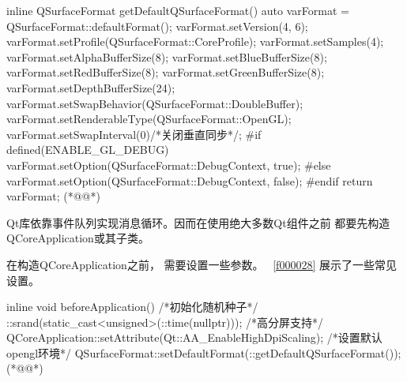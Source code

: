 \label{f000027}    %
\FloatBarrier                                  %
\begin{thebookfilesourceone}[escapeinside={(*@}{@*)},
caption=GoodLuck,
title=\filesourcenumbernameone \thefilesourcenumber
,firstnumber=18]
inline QSurfaceFormat getDefaultQSurfaceFormat() {
    auto varFormat = QSurfaceFormat::defaultFormat();
    varFormat.setVersion(4, 6);
    varFormat.setProfile(QSurfaceFormat::CoreProfile);
    varFormat.setSamples(4);
    varFormat.setAlphaBufferSize(8);
    varFormat.setBlueBufferSize(8);
    varFormat.setRedBufferSize(8);
    varFormat.setGreenBufferSize(8);
    varFormat.setDepthBufferSize(24);
    varFormat.setSwapBehavior(QSurfaceFormat::DoubleBuffer);
    varFormat.setRenderableType(QSurfaceFormat::OpenGL);
    varFormat.setSwapInterval(0)/*关闭垂直同步*/;
#if defined(ENABLE_GL_DEBUG)
    varFormat.setOption(QSurfaceFormat::DebugContext, true);
#else
    varFormat.setOption(QSurfaceFormat::DebugContext, false);
#endif
    return varFormat;
}(*@\marginpar[\hfill\setlength\fboxsep{2pt}\fbox{\footnotesize{\kaishu\parbox{1em}{\setlength{\baselineskip}{2pt}\filesourcenumbernameone}}\footnotesize{\thefilesourcenumber}}]{\setlength\fboxsep{2pt}\fbox{\footnotesize{\kaishu\parbox{1em}{\setlength{\baselineskip}{2pt}\filesourcenumbernameone}}\footnotesize{\thefilesourcenumber}}}@*)\end{thebookfilesourceone}          %
\addtocounter{lstlisting}{-1}   %

Qt库依靠事件队列实现消息循环。因而在使用绝大多数Qt组件之前
都要先构造QCoreApplication或其子类。

在构造QCoreApplication之前，
需要设置一些参数。
\filesourcenumbernameone\ \ref{f000028}
展示了一些常见设置。

\label{f000028}    %
\FloatBarrier                                  %
\begin{thebookfilesourceone}[escapeinside={(*@}{@*)},
caption=GoodLuck,
title=\filesourcenumbernameone \thefilesourcenumber
,firstnumber=39]
inline void beforeApplication() {
    {
        /*初始化随机种子*/
        ::srand(static_cast<unsigned>(::time(nullptr)));
    }
    {
        /*高分屏支持*/
        QCoreApplication::setAttribute(Qt::AA_EnableHighDpiScaling);
    }
    {
        /*设置默认opengl环境*/
        QSurfaceFormat::setDefaultFormat(::getDefaultQSurfaceFormat());
    }
}(*@\marginpar[\hfill\setlength\fboxsep{2pt}\fbox{\footnotesize{\kaishu\parbox{1em}{\setlength{\baselineskip}{2pt}\filesourcenumbernameone}}\footnotesize{\thefilesourcenumber}}]{\setlength\fboxsep{2pt}\fbox{\footnotesize{\kaishu\parbox{1em}{\setlength{\baselineskip}{2pt}\filesourcenumbernameone}}\footnotesize{\thefilesourcenumber}}}@*)\end{thebookfilesourceone}          %
\addtocounter{lstlisting}{-1}   %


